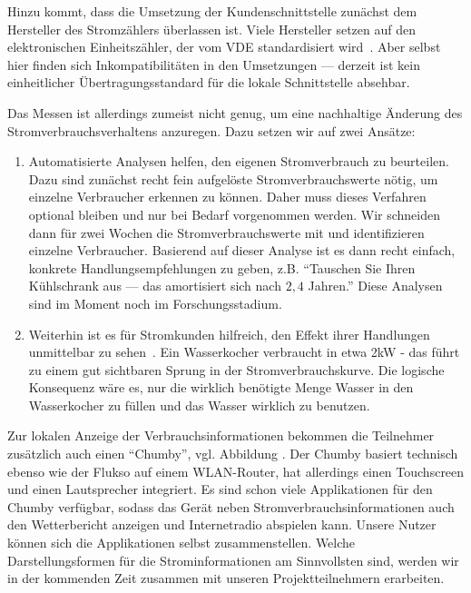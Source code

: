 \documentclass[12pt,BCOR=8.5mm]{scrartcl}
\begin{document}
Hinzu kommt, dass die Umsetzung der Kundenschnittstelle zunächst dem
Hersteller des Stromzählers überlassen ist. Viele Hersteller setzen auf den
elektronischen Einheitszähler, der vom VDE 
standardisiert wird~\cite{fnn10lastenheft}. Aber
selbst hier finden sich Inkompatibilitäten in den Umsetzungen ---
derzeit ist kein einheitlicher Übertragungsstandard für die lokale
Schnittstelle absehbar.

Das Messen ist allerdings zumeist nicht genug, um eine nachhaltige
Änderung des Stromverbrauchsverhaltens anzuregen. Dazu setzen wir auf
zwei Ansätze:

\begin{enumerate}
  \item Automatisierte Analysen helfen, den eigenen
    Stromverbrauch zu beurteilen. Dazu sind zunächst recht fein
    aufgelöste Stromverbrauchswerte nötig, um einzelne Verbraucher
    erkennen zu können. Daher muss dieses Verfahren optional bleiben und
    nur bei Bedarf vorgenommen werden. Wir schneiden dann für zwei
    Wochen die Stromverbrauchswerte mit und identifizieren einzelne
    Verbraucher. Basierend auf dieser Analyse ist es dann recht einfach,
    konkrete Handlungsempfehlungen zu geben, z.B. "`Tauschen Sie Ihren
    Kühlschrank aus --- das amortisiert sich nach $2,4$ Jahren."' 
    Diese Analysen sind im Moment noch im Forschungsstadium.
  \item Weiterhin ist es für Stromkunden hilfreich, den Effekt ihrer
    Handlungen unmittelbar zu sehen~\cite{darby2006feedback}. Ein Wasserkocher 
    verbraucht in etwa 2kW - das führt zu einem
    gut sichtbaren Sprung in der Stromverbrauchskurve. Die logische
    Konsequenz wäre es, nur die wirklich benötigte Menge Wasser in den
    Wasserkocher zu füllen und das Wasser wirklich zu benutzen.
\end{enumerate}

Zur lokalen Anzeige der Verbrauchsinformationen bekommen die Teilnehmer
zusätzlich auch einen "`Chumby"', vgl. Abbildung . Der Chumby
basiert technisch ebenso wie der Flukso auf einem WLAN-Router, hat
allerdings einen Touchscreen und einen Lautsprecher integriert. Es sind
schon viele Applikationen für den Chumby verfügbar, sodass das Gerät
neben Stromverbrauchsinformationen auch den Wetterbericht anzeigen und
Internetradio abspielen kann. Unsere Nutzer können sich die
Applikationen selbst zusammenstellen. Welche Darstellungsformen für die
Strominformationen am Sinnvollsten sind, werden wir in der kommenden
Zeit zusammen mit unseren Projektteilnehmern erarbeiten.
\end{document}
